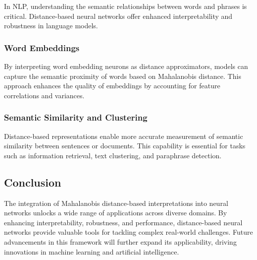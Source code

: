 In NLP, understanding the semantic relationships between words and phrases is critical. Distance-based neural networks offer enhanced interpretability and robustness in language models.

\subsubsection{Word Embeddings}
By interpreting word embedding neurons as distance approximators, models can capture the semantic proximity of words based on Mahalanobis distance. This approach enhances the quality of embeddings by accounting for feature correlations and variances.

\subsubsection{Semantic Similarity and Clustering}
Distance-based representations enable more accurate measurement of semantic similarity between sentences or documents. This capability is essential for tasks such as information retrieval, text clustering, and paraphrase detection.

\subsection{Conclusion}
\label{subsec:applications_conclusion}

The integration of Mahalanobis distance-based interpretations into neural networks unlocks a wide range of applications across diverse domains. By enhancing interpretability, robustness, and performance, distance-based neural networks provide valuable tools for tackling complex real-world challenges. Future advancements in this framework will further expand its applicability, driving innovations in machine learning and artificial intelligence.

